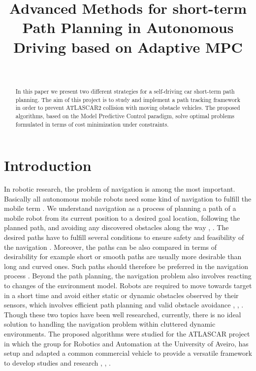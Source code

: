 \documentclass[conference, 11pt]{IEEEtran}
\title{Advanced Methods for short-term Path Planning in Autonomous Driving based on Adaptive MPC}
\author{\IEEEauthorblockN{Alberto Franco}\\
\IEEEauthorblockA{Department of Information Engineering\\
Università degli Studi di Padova\\ \href{mailto:alberto.franco.3@studenti.unipd.it}{alberto.franco.3@studenti.unipd.it}}}
\begin{document}
\maketitle
\begin{abstract}
	In this paper we present two different strategies for a self-driving car short-term path planning. The aim of this project is to study and implement a path tracking framework in order to prevent ATLASCAR2 collision with moving obstacle vehicles. The proposed algorithms, based on the Model Predictive Control paradigm, solve optimal problems formulated in terms of cost minimization under constraints.
\end{abstract}
\section{Introduction}
In robotic research, the problem of navigation is among the most important. Basically all autonomous mobile robots need some kind of navigation to fulfill the mobile term \cite{skoda}.
We understand navigation as a process of planning a path of a mobile robot from its current position to a desired goal location, following the planned path, and avoiding any discovered obstacles along the way \cite{fuzzyMPC}, \cite{NONMPC}. The desired paths have to
fulfill several conditions to ensure safety and feasibility of the navigation \cite{safety}. Moreover, the paths can be also compared in terms of desirability for example short or smooth paths are usually more desirable than long and curved ones. Such paths should therefore be preferred in the navigation process \cite{archi}. Beyond the path planning, the navigation problem also involves reacting to changes of the environment model. Robots are required to move towards target in a short time and avoid either static or dynamic obstacles observed by their sensors, which involves efficient path planning and valid obstacle avoidance \cite{MMPC}, \cite{autoMPC}, \cite{borelli}. Though these two topics have been well researched, currently, there is no ideal solution to handling the navigation problem within cluttered dynamic environments. The proposed algorithms were studied for the ATLASCAR project in which the group for Robotics and Automation at the University of Aveiro, has setup and adapted a common commercial vehicle to provide a versatile  framework  to  develop  studies  and  research
\cite{atlas}, \cite{atlascar1}, \cite{atlascar2}.
\end{document}

